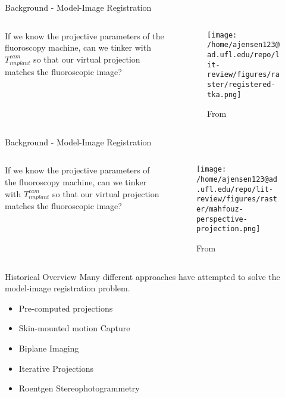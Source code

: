 \documentclass[presentation, aspectratio=1610]{beamer}
\begin{document}
\begin{frame}[label={sec:org2154104}]{Background - Model-Image Registration}
\begin{columns}
\begin{column}{0.5\columnwidth}
If we know the projective parameters of the fluoroscopy machine, can we tinker with \(T^{cam}_{implant}\) so that our virtual projection matches the fluoroscopic image?
\end{column}
\begin{column}{0.6\columnwidth}
\begin{figure}[htbp]
\centering
\texttt{[image: /home/ajensen123@ad.ufl.edu/repo/lit-review/figures/raster/registered-tka.png]}
\caption{From \autocite{mahfouzRobustMethodRegistration2003}}
\end{figure}
\end{column}
\end{columns}
\end{frame}
\begin{frame}[label={sec:org1998fec}]{Background - Model-Image Registration}
\begin{columns}
\begin{column}{0.5\columnwidth}
If we know the projective parameters of the fluoroscopy machine, can we tinker with \(T^{cam}_{implant}\) so that our virtual projection matches the fluoroscopic image?
\end{column}
\begin{column}{0.6\columnwidth}
\begin{figure}[htbp]
\centering
\texttt{[image: /home/ajensen123@ad.ufl.edu/repo/lit-review/figures/raster/mahfouz-perspective-projection.png]}
\caption{From \autocite{mahfouzRobustMethodRegistration2003}}
\end{figure}
\end{column}
\end{columns}
\end{frame}
\begin{frame}[label={sec:org221d9f4}]{Historical Overview}
Many different approaches have attempted to solve the model-image registration problem.
\begin{itemize}
\item Pre-computed projections
\item Skin-mounted motion Capture
\item Biplane Imaging
\item Iterative Projections
\item Roentgen Stereophotogrammetry
\end{itemize}
\end{frame}
\end{document}
